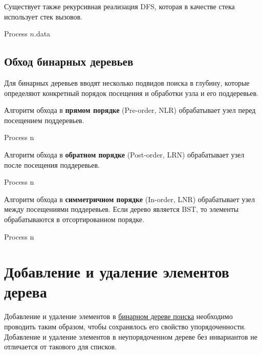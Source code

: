 Существует также рекурсивная реализация DFS, которая в качестве стека использует
стек вызовов.
\begin{algorithmic}
  \State Process $n$.data
    \State {}
  \EndFor
\EndProcedure
\end{algorithmic}

\subsection{Обход бинарных деревьев}
\label{sec:bintree-traversal}
Для бинарных деревьев вводят несколько подвидов поиска в глубину,
которые определяют конкретный порядок посещения и обработки узла и его поддеревьев.

Алгоритм обхода в \textbf{прямом порядке} (Pre-order, NLR) обрабатывает узел перед
посещением поддеревьев.
\begin{algorithmic}
    \State Process n
      \State {}
    \EndIf
      \State {}
    \EndIf
  \EndFunction
\end{algorithmic}

Алгоритм обхода в \textbf{обратном порядке} (Post-order, LRN) обрабатывает узел после
посещения поддеревьев.
\begin{algorithmic}
      \State {}
    \EndIf
      \State {}
    \EndIf
    \State Process n
  \EndFunction
\end{algorithmic}

Алгоритм обхода в \textbf{симметричном порядке} (In-order, LNR) обрабатывает узел между
посещениями поддеревьев. Если дерево является BST, то элементы обрабатываются в отсортированном
порядке.
\begin{algorithmic}
      \State {}
    \EndIf
    \State Process n
      \State {}
    \EndIf
  \EndFunction
\end{algorithmic}

\section{Добавление и удаление элементов дерева}
\label{sec:tree-ins-del}
Добавление и удаление элементов в \hyperref[def:bst]{бинарном дереве поиска} необходимо проводить таким образом,
чтобы сохранялось его свойство упорядоченности. Добавление и удаление элементов в неупорядоченном дереве без
инвариантов не отличается от такового для списков.


